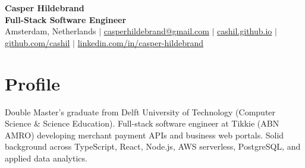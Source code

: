\documentclass[10pt,a4paper]{article}
\begin{document}
\begin{center}
  {\LARGE \textbf{Casper Hildebrand}} \\ \vspace{2pt}
  \small \textbf{Full-Stack Software Engineer} \\ \vspace{2pt}
  \footnotesize \color{subtle}
  Amsterdam, Netherlands \quad$\vert$\quad
  \href{mailto:casperhildebrand@gmail.com}{\color{primary}casperhildebrand@gmail.com} \quad$\vert$\quad
  \href{https://cashil.github.io}{\color{primary}cashil.github.io} \quad$\vert$\quad
  \href{https://github.com/cashil}{\color{primary}github.com/cashil} \quad$\vert$\quad
  \href{https://www.linkedin.com/in/casper-hildebrand/}{\color{primary}linkedin.com/in/casper-hildebrand}
\end{center}
\vspace{-4pt}

\section{Profile}
\footnotesize{
  Double Master's graduate from Delft University of Technology (Computer Science \& Science Education). Full-stack software engineer at Tikkie (ABN AMRO) developing merchant payment APIs and business web portals. Solid background across TypeScript, React, Node.js, AWS serverless, PostgreSQL, and applied data analytics.
}

\end{document}
